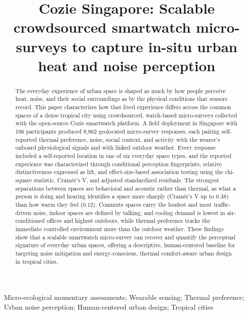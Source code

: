 \documentclass[]{interact}
\begin{document}

\title{Cozie Singapore: Scalable crowdsourced smartwatch micro-surveys to capture in-situ urban heat and noise perception}

\author{
}

\maketitle

\begin{abstract}
The everyday experience of urban space is shaped as much by how people perceive heat, noise, and their social surroundings as by the physical conditions that sensors record. This paper characterizes how that lived experience differs across the common spaces of a dense tropical city using crowdsourced, watch-based micro-surveys collected with the open-source Cozie smartwatch platform. A field deployment in Singapore with 106 participants produced 9{,}962 geolocated micro-survey responses, each pairing self-reported thermal preference, noise, social context, and activity with the wearer's onboard physiological signals and with linked outdoor weather. Every response included a self-reported location in one of six everyday space types, and the reported experience was characterized through conditional perception fingerprints, relative distinctiveness expressed as lift, and effect-size-based association testing using the chi-square statistic, Cram\'er's V, and adjusted standardized residuals. The strongest separations between spaces are behavioral and acoustic rather than thermal, as what a person is doing and hearing identifies a space more sharply (Cram\'er's V up to $0.38$) than how warm they feel ($0.12$). Commute spaces carry the loudest and most traffic-driven noise, indoor spaces are defined by talking, and cooling demand is lowest in air-conditioned offices and highest outdoors, while thermal preference tracks the immediate controlled environment more than the outdoor weather. These findings show that a scalable smartwatch micro-survey can recover and quantify the perceptual signature of everyday urban spaces, offering a descriptive, human-centered baseline for targeting noise mitigation and energy-conscious, thermal comfort-aware urban design in tropical cities.
\end{abstract}

\begin{keywords}
Micro-ecological momentary assessments; Wearable sensing; Thermal preference; Urban noise perception; Human-centered urban design; Tropical cities
\end{keywords}
\end{document}
